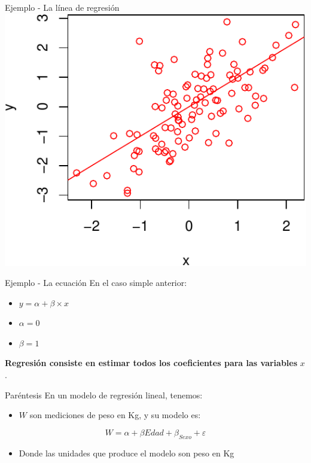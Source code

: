 \documentclass[
  11pt,
  ignorenonframetext,
]{beamer}
\providecommand{\tightlist}{%
  \setlength{\itemsep}{0pt}\setlength{\parskip}{0pt}}
\begin{document}
\begin{frame}{Ejemplo - La línea de regresión}
\protect\hypertarget{ejemplo---la-luxednea-de-regresiuxf3n}{}
\includegraphics{Generalidades_files/figure-beamer/unnamed-chunk-4-1.pdf}
\end{frame}

\begin{frame}{Ejemplo - La ecuación}
\protect\hypertarget{ejemplo---la-ecuaciuxf3n}{}
En el caso simple anterior:

\begin{itemize}
\item
  \(y = \alpha + \beta \times x\)
\item
  \(\alpha = 0\)
\item
  \(\beta = 1\)
\end{itemize}

\textbf{Regresión consiste en estimar todos los coeficientes para las
variables} \(x\).
\end{frame}

\begin{frame}{Paréntesis}
\protect\hypertarget{paruxe9ntesis}{}
En un modelo de regresión lineal, tenemos:

\begin{itemize}
\tightlist
\item
  \(W\) son mediciones de peso en Kg, y su modelo es:
\end{itemize}

\[W = \alpha + \beta Edad + \beta_{Sexo} + \varepsilon\]

\begin{itemize}
\tightlist
\item
  Donde las unidades que produce el modelo son peso en Kg
\end{itemize}
\end{frame}
\end{document}
